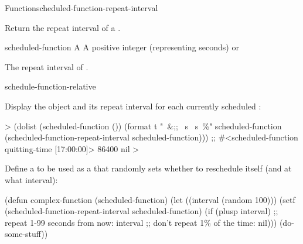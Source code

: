 \documentclass[10pt,twoside,english,pdftex]{article}
\begin{document}
\begin{functiondoc}{Function}{scheduled-function-repeat-interval}%
  {
    }
%
%

\fnsyntax

\fnpurpose Return the repeat interval of a .

\fnsetf
{}%
  {}{}

\fnpackage {}

\fnmodule {}

\fnargs
\begin{args}{scheduled-function}
 A 
 A positive integer (representing seconds) or \nil
\end{args}

\fnreturns The repeat interval of . 

\begin{alsos}{schedule-function-relative}
\end{alsos}

%
\fnexamples
% 
Display the  object and its repeat interval
for each currently scheduled :
%
\W\supp
\begin{example}
  > (dolist (scheduled-function ())
     (format t "~&;; ~s ~s~\%"
             scheduled-function
             (scheduled-function-repeat-interval scheduled-function)))
  ;; #<scheduled-function quitting-time [17:00:00]> 86400
  nil
  >
\end{example}

Define a  to be used as a  that
randomly sets whether to reschedule itself (and at what interval):
%
\W\supp
\begin{example}
  (defun complex-function (scheduled-function)
    (let ((interval (random 100)))
      (setf (scheduled-function-repeat-interval scheduled-function)
            (if (plusp interval) 
                ;; repeat 1-99 seconds from now:
                interval
                ;; don't repeat 1\% of the time:
                nil)))
    (do-some-stuff))
\end{example}

\end{functiondoc}
\end{document}
